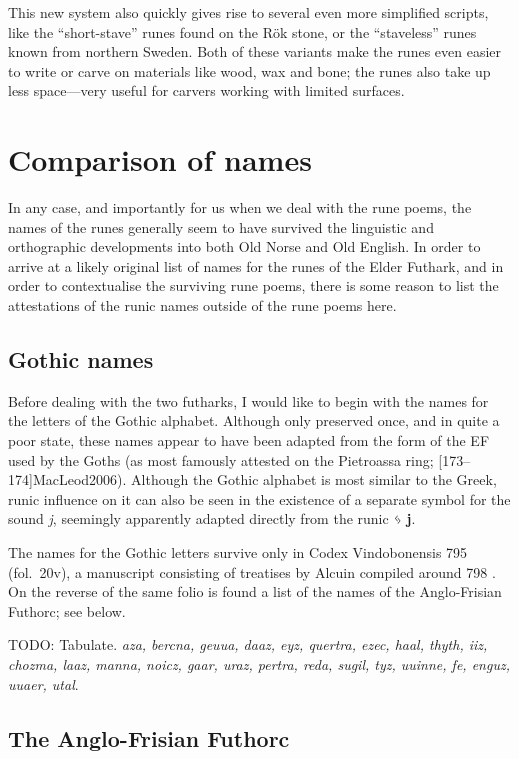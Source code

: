 This new system also quickly gives rise to several even more simplified scripts, like the “short-stave” runes found on the Rök stone, or the “staveless” runes known from northern Sweden.  Both of these variants make the runes even easier to write or carve on materials like wood, wax and bone; the runes also take up less space---very useful for carvers working with limited surfaces.

\section{Comparison of names}

In any case, and importantly for us when we deal with the rune poems, the names of the runes generally seem to have survived the linguistic and orthographic developments into both Old Norse and Old English.  In order to arrive at a likely original list of names for the runes of the Elder Futhark, and in order to contextualise the surviving rune poems, there is some reason to list the attestations of the runic names outside of the rune poems here.

\subsection{Gothic names}

Before dealing with the two futharks, I would like to begin with the names for the letters of the Gothic alphabet.  Although only preserved once, and in quite a poor state, these names appear to have been adapted from the form of the EF used by the Goths (as most famously attested on the Pietroassa ring; \cite[280]{Antonsen2002}[173--174]{MacLeod2006}).  Although the Gothic alphabet is most similar to the Greek, runic influence on it can also be seen in the existence of a separate symbol for the sound \emph{j}, seemingly apparently adapted directly from the runic ᛃ \textbf{j}.

The names for the Gothic letters survive only in Codex Vindobonensis 795 (fol.~20v), a manuscript consisting of treatises by Alcuin compiled around 798 \ce.  On the reverse of the same folio is found a list of the names of the Anglo-Frisian Futhorc; see below.

TODO: Tabulate.  \emph{aza, bercna, geuua, daaz, eyz, quertra, ezec, haal, thyth, iiz, chozma, laaz, manna, noicz, gaar, uraz, pertra, reda, sugil, tyz, uuinne, fe, enguz, uuaer, utal}.

\subsection{The Anglo-Frisian Futhorc}

